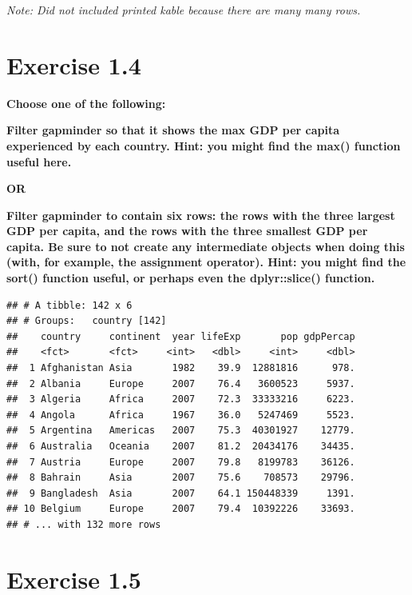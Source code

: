 \documentclass[]{article}
\newenvironment{Shaded}{\begin{snugshade}}{\end{snugshade}}
\newcommand{\KeywordTok}[1]{\textcolor[rgb]{0.13,0.29,0.53}{\textbf{#1}}}
\newcommand{\NormalTok}[1]{#1}
\newcommand{\OperatorTok}[1]{\textcolor[rgb]{0.81,0.36,0.00}{\textbf{#1}}}
\newcommand{\StringTok}[1]{\textcolor[rgb]{0.31,0.60,0.02}{#1}}
\begin{document}
\emph{Note: Did not included printed kable because there are many many
rows.}

\hypertarget{exercise-1.4}{%
\section{Exercise 1.4}\label{exercise-1.4}}

\textbf{Choose one of the following:}

\textbf{Filter gapminder so that it shows the max GDP per capita
experienced by each country. Hint: you might find the max() function
useful here.}

\textbf{OR}

\textbf{Filter gapminder to contain six rows: the rows with the three
largest GDP per capita, and the rows with the three smallest GDP per
capita. Be sure to not create any intermediate objects when doing this
(with, for example, the assignment operator). Hint: you might find the
sort() function useful, or perhaps even the dplyr::slice() function.}

\begin{Shaded}
\end{Shaded}

\begin{verbatim}
## # A tibble: 142 x 6
## # Groups:   country [142]
##    country     continent  year lifeExp       pop gdpPercap
##    <fct>       <fct>     <int>   <dbl>     <int>     <dbl>
##  1 Afghanistan Asia       1982    39.9  12881816      978.
##  2 Albania     Europe     2007    76.4   3600523     5937.
##  3 Algeria     Africa     2007    72.3  33333216     6223.
##  4 Angola      Africa     1967    36.0   5247469     5523.
##  5 Argentina   Americas   2007    75.3  40301927    12779.
##  6 Australia   Oceania    2007    81.2  20434176    34435.
##  7 Austria     Europe     2007    79.8   8199783    36126.
##  8 Bahrain     Asia       2007    75.6    708573    29796.
##  9 Bangladesh  Asia       2007    64.1 150448339     1391.
## 10 Belgium     Europe     2007    79.4  10392226    33693.
## # ... with 132 more rows
\end{verbatim}

\hypertarget{exercise-1.5}{%
\section{Exercise 1.5}\label{exercise-1.5}}
\end{document}
